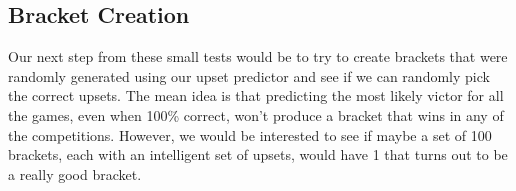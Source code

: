 \subsection{Bracket Creation}

Our next step from these small tests would be to try to create brackets that were randomly generated using our upset predictor and see if we can randomly pick the correct upsets.
The mean idea is that predicting the most likely victor for all the games, even when 100\% correct, won't produce a bracket that wins in any of the competitions.
However, we would be interested to see if maybe a set of 100 brackets, each with an intelligent set of upsets, would have 1 that turns out to be a really good bracket.
